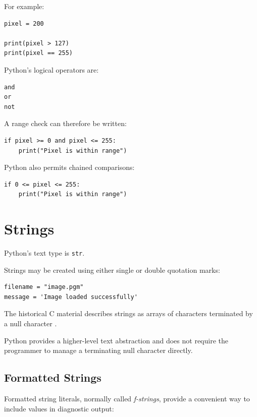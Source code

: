 For example:

\begin{verbatim}
pixel = 200

print(pixel > 127)
print(pixel == 255)
\end{verbatim}

Python's logical operators are:

\begin{verbatim}
and
or
not
\end{verbatim}

A range check can therefore be written:

\begin{verbatim}
if pixel >= 0 and pixel <= 255:
    print("Pixel is within range")
\end{verbatim}

Python also permits chained comparisons:

\begin{verbatim}
if 0 <= pixel <= 255:
    print("Pixel is within range")
\end{verbatim}


\section{Strings}
\label{sec:python-strings}

Python's text type is \texttt{str}.

Strings may be created using either single or double quotation marks:

\begin{verbatim}
filename = "image.pgm"
message = 'Image loaded successfully'
\end{verbatim}

The historical C material describes strings as arrays of characters
terminated by a null character
\cite{johnson_uqc146_intro}.

Python provides a higher-level text abstraction and does not require
the programmer to manage a terminating null character directly.


\subsection{Formatted Strings}

Formatted string literals, normally called \emph{f-strings}, provide
a convenient way to include values in diagnostic output:

